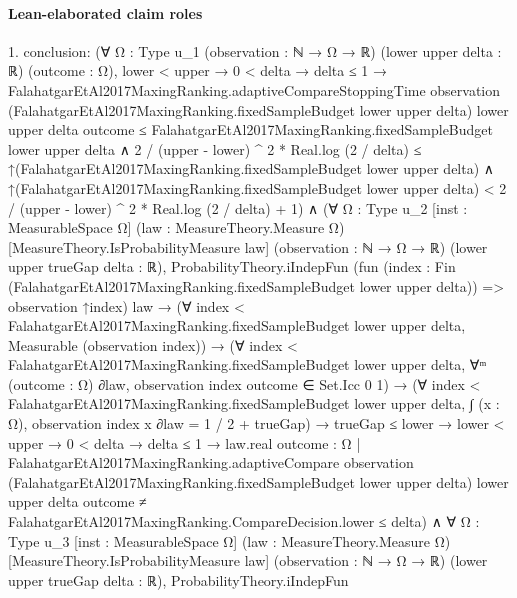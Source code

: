 \documentclass[10pt]{article}
\begin{document}
\paragraph{Lean-elaborated claim roles}\begin{ReviewVerbatim}
1. conclusion: (∀ {Ω : Type u_1} (observation : ℕ → Ω → ℝ) (lower upper delta : ℝ) (outcome : Ω),
    lower < upper →
      0 < delta →
        delta ≤ 1 →
          FalahatgarEtAl2017MaxingRanking.adaptiveCompareStoppingTime observation
                (FalahatgarEtAl2017MaxingRanking.fixedSampleBudget lower upper delta) lower upper delta outcome ≤
              FalahatgarEtAl2017MaxingRanking.fixedSampleBudget lower upper delta ∧
            2 / (upper - lower) ^ 2 * Real.log (2 / delta) ≤
                ↑(FalahatgarEtAl2017MaxingRanking.fixedSampleBudget lower upper delta) ∧
              ↑(FalahatgarEtAl2017MaxingRanking.fixedSampleBudget lower upper delta) <
                2 / (upper - lower) ^ 2 * Real.log (2 / delta) + 1) ∧
  (∀ {Ω : Type u_2} [inst : MeasurableSpace Ω] (law : MeasureTheory.Measure Ω) [MeasureTheory.IsProbabilityMeasure law]
      (observation : ℕ → Ω → ℝ) (lower upper trueGap delta : ℝ),
      ProbabilityTheory.iIndepFun
          (fun (index : Fin (FalahatgarEtAl2017MaxingRanking.fixedSampleBudget lower upper delta)) =>
            observation ↑index)
          law →
        (∀ index < FalahatgarEtAl2017MaxingRanking.fixedSampleBudget lower upper delta,
            Measurable (observation index)) →
          (∀ index < FalahatgarEtAl2017MaxingRanking.fixedSampleBudget lower upper delta,
              ∀ᵐ (outcome : Ω) ∂law, observation index outcome ∈ Set.Icc 0 1) →
            (∀ index < FalahatgarEtAl2017MaxingRanking.fixedSampleBudget lower upper delta,
                ∫ (x : Ω), observation index x ∂law = 1 / 2 + trueGap) →
              trueGap ≤ lower →
                lower < upper →
                  0 < delta →
                    delta ≤ 1 →
                      law.real
                          {outcome : Ω |
                            FalahatgarEtAl2017MaxingRanking.adaptiveCompare observation
                                (FalahatgarEtAl2017MaxingRanking.fixedSampleBudget lower upper delta) lower upper delta
                                outcome ≠
                              FalahatgarEtAl2017MaxingRanking.CompareDecision.lower} ≤
                        delta) ∧
    ∀ {Ω : Type u_3} [inst : MeasurableSpace Ω] (law : MeasureTheory.Measure Ω) [MeasureTheory.IsProbabilityMeasure law]
      (observation : ℕ → Ω → ℝ) (lower upper trueGap delta : ℝ),
      ProbabilityTheory.iIndepFun

\end{ReviewVerbatim}
\end{document}
